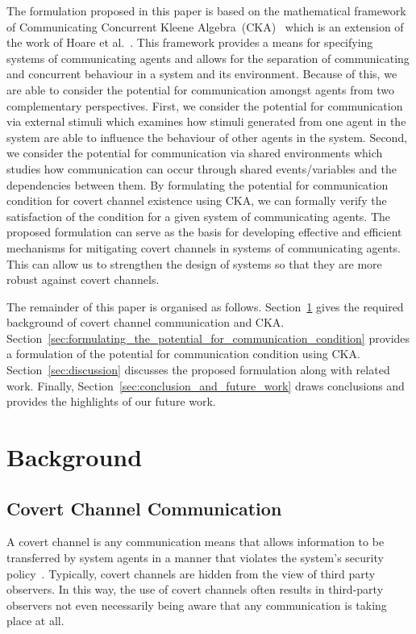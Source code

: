\documentclass[copyright,creativecommons]{eptcs}
\makeatletter
\newcommand{\etal}{\textrm{et al.}\@\xspace}
\newcommand{\PFC}{potential for communication\@\xspace}
\newcommand{\soca}{system of communicating agents\@\xspace}
\newcommand{\socas}{systems of communicating agents\@\xspace}
\newcommand{\CCKA}{Communicating Concurrent Kleene Algebra\@\xspace}
\newcommand{\CCKAabbrv}{CKA\@\xspace}
\makeatother
\begin{document}
The formulation proposed in this paper is based on the mathematical framework of \CCKA~(\CCKAabbrv)~\cite{Jaskolka2013aa,Jaskolka2014aa} which is an extension of the work of Hoare \etal~\cite{Hoare2009aa,Hoare2009ab,Hoare2010aa,Hoare2011aa}. This framework provides a means for specifying \socas and allows for the separation of communicating and concurrent behaviour in a system and its environment. Because of this, we are able to consider the potential for communication amongst agents from two complementary perspectives. First, we consider the \PFC via external stimuli which examines how stimuli generated from one agent in the system are able to influence the behaviour of other agents in the system. Second, we consider the \PFC via shared environments which studies how communication can occur through shared events/variables and the dependencies between them. By formulating the \PFC condition for covert channel existence using \CCKAabbrv, we can formally verify the satisfaction of the condition for a given \soca. The proposed formulation can serve as the basis for developing effective and efficient mechanisms for mitigating covert channels in \socas. This can allow us to strengthen the design of systems so that they are more robust against covert channels. 

The remainder of this paper is organised as follows. Section~\ref{sec:background} gives the required background of covert channel communication and \CCKAabbrv. Section~\ref{sec:formulating_the_potential_for_communication_condition} provides a formulation of the \PFC condition using \CCKAabbrv. Section~\ref{sec:discussion} discusses the proposed formulation along with related work. Finally, Section~\ref{sec:conclusion_and_future_work} draws conclusions and provides the highlights of our future work. 

\vspace{-0.1in}
\section{Background} 
\label{sec:background}
\vspace{-0.1in}
\subsection{Covert Channel Communication}
\label{sub:covert_channel_communication}


A covert channel is any communication means that allows information to be transferred by system agents in a manner that violates the system's security policy~\cite{DoD1985aa}. Typically, covert channels are hidden from the view of third party observers. In this way, the use of covert channels often results in third-party observers not even necessarily being aware that any communication is taking place at all.
\end{document}
